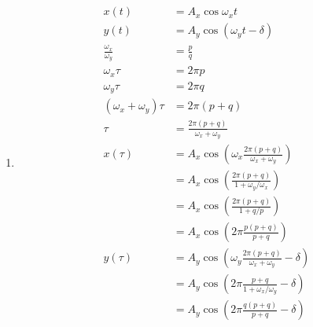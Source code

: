 \documentclass{article}
\begin{document}
\setcounter{subsection}{16}
\subsection{}

\begin{enumerate}
  \item

        \begin{align*}
          x(t)                       & = A_x \cos \omega_x t                                                                 \\
          y(t)                       & = A_y \cos (\omega_y t - \delta)                                                      \\
          \frac{\omega_x}{\omega_y}  & = \frac{p}{q}                                                                         \\
          \omega_x \tau              & = 2 \pi p                                                                             \\
          \omega_y \tau              & = 2 \pi q                                                                             \\
          (\omega_x + \omega_y) \tau & = 2 \pi (p + q)                                                                       \\
          \tau                       & = \frac{2 \pi (p + q)}{\omega_x + \omega_y}                                           \\
          x(\tau)                    & = A_x \cos \left( \omega_x \frac{2 \pi (p + q)}{\omega_x + \omega_y} \right)          \\
                                     & = A_x \cos \left( \frac{2 \pi (p + q)}{1 + \omega_y / \omega_x} \right)               \\
                                     & = A_x \cos \left( \frac{2 \pi (p + q)}{1 + q / p} \right)                             \\
                                     & = A_x \cos \left( 2 \pi \frac{p (p + q)}{p + q} \right)                               \\
          y(\tau)                    & = A_y \cos \left( \omega_y \frac{2 \pi (p + q)}{\omega_x + \omega_y} - \delta \right) \\
                                     & = A_y \cos \left( 2 \pi \frac{p + q}{1 + \omega_x / \omega_y} - \delta \right)        \\
                                     & = A_y \cos \left( 2 \pi \frac{q (p + q)}{p + q} - \delta \right)
        \end{align*}
\end{enumerate}
\end{document}
